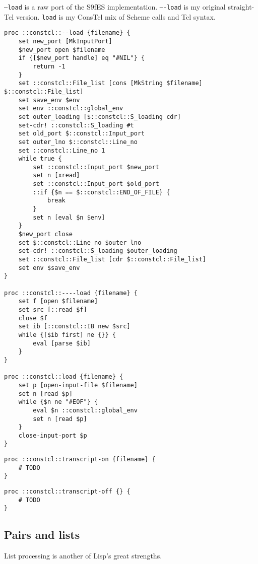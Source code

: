 \documentclass{report}
\begin{document}
\texttt{--load} is a raw port of the S9fES implementation. \texttt{----load} is my original straight-Tcl version. \texttt{load} is my ConsTcl mix of Scheme calls and Tcl syntax.

\noindent\makebox[\linewidth]{\rule{\linewidth}{0.4pt}}
\begin{lstlisting}
proc ::constcl::--load {filename} {
    set new_port [MkInputPort]
    $new_port open $filename
    if {[$new_port handle] eq "#NIL"} {
        return -1
    }
    set ::constcl::File_list [cons [MkString $filename] $::constcl::File_list]
    set save_env $env
    set env ::constcl::global_env
    set outer_loading [$::constcl::S_loading cdr]
    set-cdr! ::constcl::S_loading #t
    set old_port $::constcl::Input_port
    set outer_lno $::constcl::Line_no
    set ::constcl::Line_no 1
    while true {
        set ::constcl::Input_port $new_port
        set n [xread]
        set ::constcl::Input_port $old_port
        ::if {$n == $::constcl::END_OF_FILE} {
            break
        }
        set n [eval $n $env]
    }
    $new_port close
    set $::constcl::Line_no $outer_lno
    set-cdr! ::constcl::S_loading $outer_loading
    set ::constcl::File_list [cdr $::constcl::File_list]
    set env $save_env
}
 
proc ::constcl::----load {filename} {
    set f [open $filename]
    set src [::read $f]
    close $f
    set ib [::constcl::IB new $src]
    while {[$ib first] ne {}} {
        eval [parse $ib]
    }
}
 
proc ::constcl::load {filename} {
    set p [open-input-file $filename]
    set n [read $p]
    while {$n ne "#EOF"} {
        eval $n ::constcl::global_env
        set n [read $p]
    }
    close-input-port $p
}
\end{lstlisting}
\noindent\makebox[\linewidth]{\rule{\linewidth}{0.4pt}}
\noindent\makebox[\linewidth]{\rule{\linewidth}{0.4pt}}
\begin{lstlisting}
proc ::constcl::transcript-on {filename} {
    # TODO
}
\end{lstlisting}
\noindent\makebox[\linewidth]{\rule{\linewidth}{0.4pt}}
\noindent\makebox[\linewidth]{\rule{\linewidth}{0.4pt}}
\begin{lstlisting}
proc ::constcl::transcript-off {} {
    # TODO
}
\end{lstlisting}
\noindent\makebox[\linewidth]{\rule{\linewidth}{0.4pt}}
\subsection{Pairs and lists}
\label{pairs-and-lists}

List processing is another of Lisp's great strengths.
\end{document}
